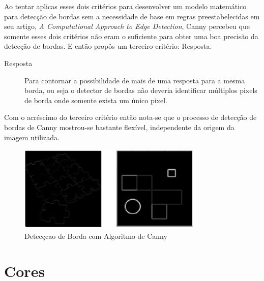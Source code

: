 Ao tentar aplicas esses dois critérios para desenvolver um modelo matemático para detecção de bordas sem a necessidade de base em regras preestabelecidas em seu artigo,
\textit{A Computational Approach to Edge Detection}, Canny percebeu que somente esses dois critérios não eram o suficiente para obter uma boa precisão da detecção de bordas. E então propôs um terceiro critério: Resposta.
\begin{description}
	\item[Resposta] Para contornar a possibilidade de mais de uma resposta para a mesma borda, ou seja o detector de bordas não deveria identificar múltiplos pixels de borda onde somente exista um único pixel\cite{Wangenheim:2014, Canny:1986, Vale:2002}.
\end{description}


Com o acréscimo do terceiro critério então nota-se que o processo de detecção de bordas de Canny
mostrou-se bastante flexível, independente da origem da imagem utilizada\cite{Vale:2002}.
 \begin{figure}[!h]
	\centering
	\includegraphics[width=0.8\textwidth]{canny.pdf}
	\caption{Detecçcao de Borda com Algoritmo de Canny\cite{Saini:2013} }
	\label{Canny}
\end{figure}







\section{Cores} \label{Sec:Cores}


